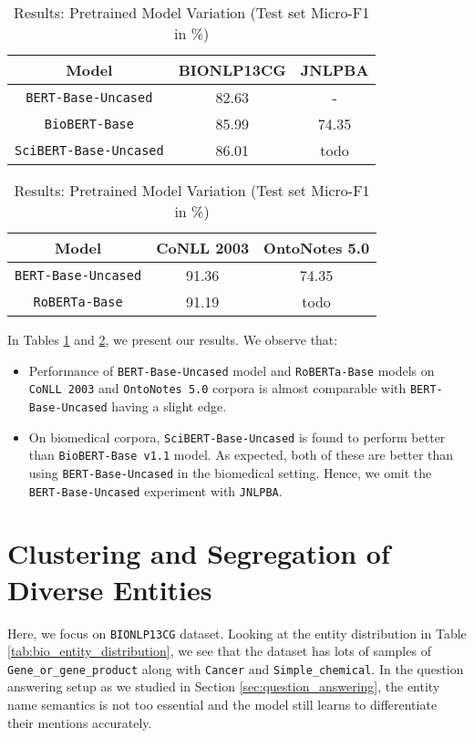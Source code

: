 \begin{table}[h!]
\centering
\begin{tabular}{|c|c|c|}\hline
	\textbf{Model} & \textbf{BIONLP13CG} & \textbf{JNLPBA}\\\hline
	\texttt{BERT-Base-Uncased} & 82.63 & -\\\hline
	\texttt{BioBERT-Base} & 85.99 & 74.35\\\hline
	\texttt{SciBERT-Base-Uncased} & 86.01 & todo\\\hline
	\end{tabular}
    \caption{Results: Pretrained Model Variation (Test set Micro-F1 in \%)}
    \label{tab:res_pretrained_model_bio}
\end{table}

\begin{table}[h!]
\centering
\begin{tabular}{|c|c|c|}\hline
	\textbf{Model} & \textbf{CoNLL 2003} & \textbf{OntoNotes 5.0}\\\hline
	\texttt{BERT-Base-Uncased} & 91.36 & 74.35\\\hline
	\texttt{RoBERTa-Base} & 91.19 & todo\\\hline
	\end{tabular}
    \caption{Results: Pretrained Model Variation (Test set Micro-F1 in \%)}
    \label{tab:res_pretrained_model_general}
\end{table}

In Tables \ref{tab:res_pretrained_model_bio} and \ref{tab:res_pretrained_model_general}, we present our results. We observe that:

\begin{itemize}
    \item Performance of \texttt{BERT-Base-Uncased} model and \texttt{RoBERTa-Base} models on \texttt{CoNLL 2003} and \texttt{OntoNotes 5.0} corpora is almost comparable with \texttt{BERT-Base-Uncased} having a slight edge.
    
    \item On biomedical corpora, \texttt{SciBERT-Base-Uncased} is found to perform better than \texttt{BioBERT-Base v1.1} model. As expected, both of these are better than using \texttt{BERT-Base-Uncased} in the biomedical setting. Hence, we omit the \texttt{BERT-Base-Uncased} experiment with \texttt{JNLPBA}.
\end{itemize}

\section{Clustering and Segregation of Diverse Entities}
\label{sec:clustering}
Here, we focus on \texttt{BIONLP13CG} dataset. Looking at the entity distribution in Table \ref{tab:bio_entity_distribution}, we see that the dataset has lots of samples of \texttt{Gene\_or\_gene\_product} along with \texttt{Cancer} and \texttt{Simple\_chemical}. In the question answering setup as we studied in Section \ref{sec:question_answering}, the entity name semantics is not too essential and the model still learns to differentiate their mentions accurately. 

